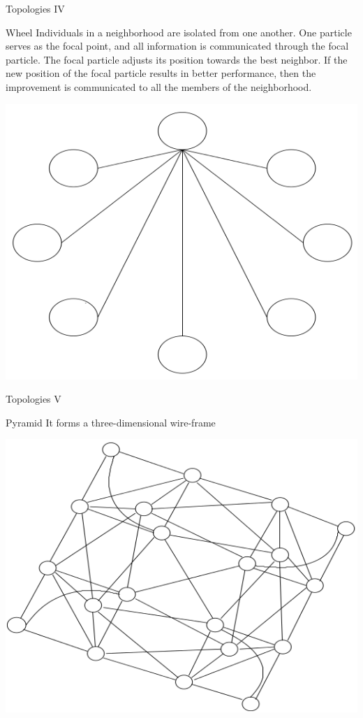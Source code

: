 \documentclass[aspectratio=169,compress,10pt]{beamer}
\begin{document}
\begin{frame}{Topologies IV}
\begin{block}{Wheel}
Individuals in a neighborhood are isolated from one another.
One particle serves as the focal point, and all information
is communicated through the focal particle.
The focal particle adjusts its position towards the best neighbor. If the new position of the focal particle results in better performance, then the improvement is communicated to all the members of the neighborhood.

\centering
\includegraphics[scale=0.25]{../resources/wheel}
\end{block}
\end{frame}


\begin{frame}{Topologies V}
\begin{block}{Pyramid}
It forms a three-dimensional wire-frame

\centering
\includegraphics[scale=0.25]{../resources/pyramid}
\end{block}
\end{frame}
\end{document}
